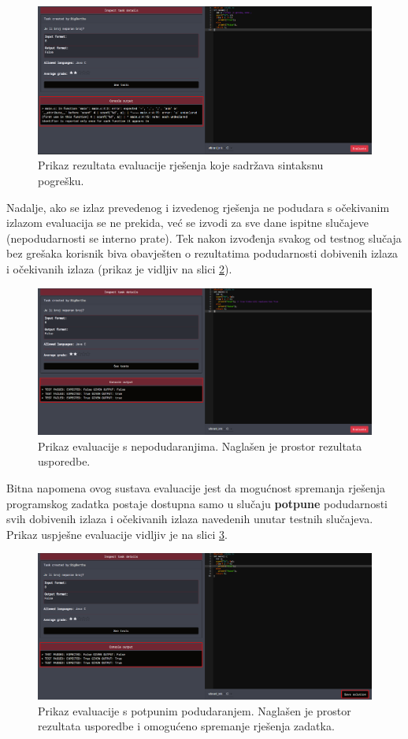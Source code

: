 \documentclass[times, utf8, zavrsni, numeric]{fer}
\begin{document}
	\begin{figure}[H]
		\centering
		\includegraphics[width=\linewidth]{pictures/evaluacija/error.png}
		\caption{Prikaz rezultata evaluacije rješenja koje sadržava sintaksnu pogrešku.}
		\label{fig:error}
	\end{figure}
	Nadalje, ako se izlaz prevedenog i izvedenog rješenja ne podudara s očekivanim izlazom evaluacija se ne prekida, već se izvodi za sve dane ispitne slučajeve (nepodudarnosti se interno prate). Tek nakon izvođenja svakog od testnog slučaja bez grešaka korisnik biva obavješten o rezultatima podudarnosti dobivenih izlaza i očekivanih izlaza (prikaz je vidljiv na slici \ref{fig:badeval}).
	\begin{figure}[H]
		\centering
		\includegraphics[width=\linewidth]{pictures/evaluacija/badeval.png}
		\caption{Prikaz evaluacije s nepodudaranjima. Naglašen je prostor rezultata usporedbe.}
		\label{fig:badeval}
	\end{figure} 
	Bitna napomena ovog sustava evaluacije jest da mogućnost spremanja rješenja programskog zadatka postaje dostupna samo u slučaju \textbf{potpune} podudarnosti svih dobivenih izlaza i očekivanih izlaza navedenih unutar testnih slučajeva. Prikaz uspješne evaluacije vidljiv je na slici \ref{fig:goodeval}. 
	\begin{figure}[H]
		\centering
		\includegraphics[width=\linewidth]{pictures/evaluacija/goodeval.png}
		\caption{Prikaz evaluacije s potpunim podudaranjem. Naglašen je prostor rezultata usporedbe i omogućeno spremanje rješenja zadatka.}
		\label{fig:goodeval}
	\end{figure}
\end{document}
